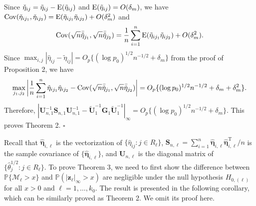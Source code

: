 \documentclass[12pt]{article}
\numberwithin{equation}{section}
\def\T{{ \mathrm{\scriptscriptstyle T} }}
\newcommand{\E}{\rm E}
\newcommand{\Cor}{\rm Corr}
\newcommand{\Cov}{\rm Cov}
\newcommand{\bG}{{\mathbf G}}
\newcommand{\bS}{{\mathbf S}}
\newcommand{\bU}{{\mathbf U}}
\newcommand{\bW}{{\mathbf W}}
\newcommand{\bz}{{\mathbf z}}
\newcommand{\bfeta}  {\boldsymbol{\eta}}
\begin{document}
Since $\check{\eta}_{ij} = \tilde{\eta}_{ij} - {\E}(\tilde{\eta}_{ij})$ and ${\E}(\tilde{\eta}_{ij}) = O(\delta_m)$, we have ${\Cov}(\check{\eta}_{ij_1}, \check{\eta}_{ij_2}) = {\E}(\tilde{\eta}_{ij_1}\tilde{\eta}_{ij_2}) + O(\delta_m^2)$ and 
$${\Cov}(\sqrt{n}\bar{\check\eta}_{j_1}, \sqrt{n}\bar{\check\eta}_{j_2}) = \frac{1}{n} \sum_{i = 1}^{n} {\E}(\tilde{\eta}_{ij_1}\tilde{\eta}_{ij_2}) + O(\delta_m^2).$$
Since $\max_{i,j} |\hat{\eta}_{ij} - \tilde{\eta}_{ij}| = O_{p}\{(\log p_0)^{1/2} n^{-1/2} + \delta_m\}$ from the proof of Proposition 2, we have
$$\max_{j_1, j_2} \bigg|\frac{1}{n}\sum_{i = 1}^{n} \hat{\eta}_{i j_1}\hat{\eta}_{i j_2} - {\Cov}(\sqrt{n}\bar{\check\eta}_{j_1}, \sqrt{n}\bar{\check\eta}_{j_2})\bigg| = O_{p}\{(\log p_0)^{1/2} n^{-1/2} + \delta_m + \delta_m^2\}.$$
Therefore, $|\bU_{n, 1}^{-1} \bS_{n, 1} \bU_{n, 1}^{-1} - \tilde{\bU}_{1}^{-1}\bG_{1}\tilde{\bU}_{1}^{-1}|_{\infty} = O_{p}\{(\log p_0)^{1/2} n^{-1/2} + \delta_m\}$.
This proves Theorem 2. $\square$

\medskip
Recall that $\hat{\bfeta}_{i, \ell}$ is the vectorization of $\{\hat{\eta}_{ij} : j \in R_{\ell}\}$, $\bS_{n, \ell} = \sum_{i = 1}^{n} \hat{\bfeta}_{i, \ell} \hat{\bfeta}_{i, \ell}^{\T} / n$ is the sample covariance of $\{\hat{\bfeta}_{i, \ell}\}$, and $\bU_{n, \ell}$ is the diagonal matrix of $\{\hat{\theta}_{j}^{1/2}: j \in R_\ell\}$.
To prove Theorem 3, we need to first show the difference between $\mathbb{P}\{\mathcal{M}_{\ell} > x\}$ and $\mathbb{P}(|\bz_{\ell}|_{\infty} > x)$ are negligible under the null hypothesis $H_{0, (\ell)}$ for all $x > 0$ and $\ell = 1, \ldots, k_0$. The result is presented in the following corollary, which can be similarly proved as Theorem 2. We omit its proof here.

\end{document}

